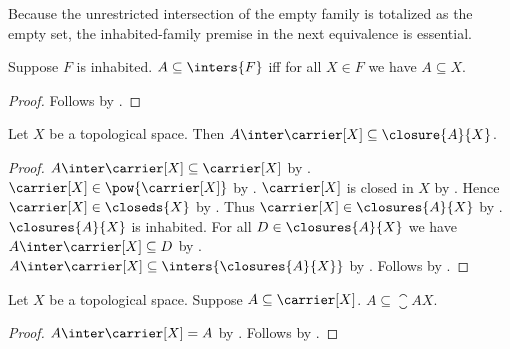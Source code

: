 Because the unrestricted intersection of the empty family is totalized as the
empty set, the inhabited-family premise in the next equivalence is essential.

\begin{proposition}\label{subseteq_inters_iff_new}
    Suppose $F$ is inhabited.
    $A \subseteq \inters{F}$ iff for all $X \in F$ we have $A \subseteq X$.
\end{proposition}
\begin{proof}
    Follows by .
\end{proof}

\begin{proposition}\label{trace_is_subseteq_to_closure}
    Let $X$ be a topological space.
    Then $A\inter\carrier[X]\subseteq\closure{A}{X}$.
\end{proposition}
\begin{proof}
    $A\inter\carrier[X]\subseteq\carrier[X]$
        by .
    $\carrier[X]\in\pow{\carrier[X]}$
        by .
    $\carrier[X]$ is closed in $X$ by .
    Hence $\carrier[X]\in\closeds{X}$ by .
    Thus $\carrier[X]\in\closures{A}{X}$ by .
    $\closures{A}{X}$ is inhabited.
    For all $D\in\closures{A}{X}$ we have
        $A\inter\carrier[X]\subseteq D$ by .
    $A\inter\carrier[X]\subseteq\inters{\closures{A}{X}}$
        by .
    Follows by .
\end{proof}

\begin{proposition}\label{set_is_subseteq_to_closure_of_the_set}
    Let $X$ be a topological space.
    Suppose $A \subseteq \carrier[X]$.
    $A \subseteq \closure{A}{X}$.
\end{proposition}
\begin{proof}
    $A\inter\carrier[X]=A$ by .
    Follows by .
\end{proof}

